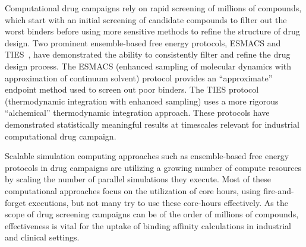 
Computational drug campaigns rely on rapid screening of millions of compounds,
which start with an initial screening of candidate compounds to filter out the
worst binders before using more sensitive methods to refine the structure of
drug design. Two  prominent
ensemble-based  free energy protocols, ESMACS and TIES~\cite{Bhati2017}, have
demonstrated the  ability to consistently filter and refine the drug design
process. The ESMACS  (enhanced sampling of molecular dynamics with approximation
of continuum solvent) protocol provides an ``approximate'' endpoint method used
to screen out poor binders. The TIES protocol (thermodynamic integration with
enhanced sampling) uses a more rigorous ``alchemical'' thermodynamic integration
approach. These protocols have demonstrated statistically meaningful results at
timescales relevant for industrial computational drug
campaign\cite{Wan2017brd4}. 


Scalable simulation computing approaches such as ensemble-based free energy
protocols in drug campaigns are utilizing a growing number of compute
resources by scaling the number of parallel simulations they execute. Most of
these computational approaches focus on the utilization of core hours, using
fire-and-forget executions, but not many try to use these core-hours
effectively. As the scope of drug screening campaigns can be of the order of
millions of compounds, effectiveness is vital for the uptake of binding
affinity calculations in industrial and clinical settings. 


 

